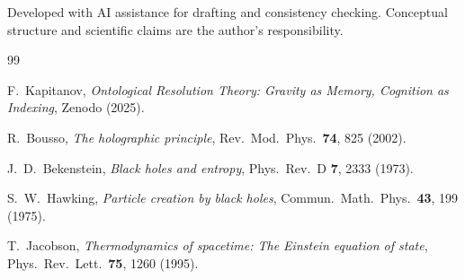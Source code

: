 \documentclass[12pt,a4paper]{article}
\begin{document}
Developed with AI assistance for drafting and consistency checking. Conceptual structure and scientific claims are the author's responsibility.

\begin{thebibliography}{99}

F.~Kapitanov,
\emph{Ontological Resolution Theory: Gravity as Memory, Cognition as Indexing},
Zenodo (2025).

R.~Bousso,
\emph{The holographic principle},
Rev.\ Mod.\ Phys.\ \textbf{74}, 825 (2002).

J.~D.~Bekenstein,
\emph{Black holes and entropy},
Phys.\ Rev.\ D \textbf{7}, 2333 (1973).

S.~W.~Hawking,
\emph{Particle creation by black holes},
Commun.\ Math.\ Phys.\ \textbf{43}, 199 (1975).

T.~Jacobson,
\emph{Thermodynamics of spacetime: The Einstein equation of state},
Phys.\ Rev.\ Lett.\ \textbf{75}, 1260 (1995).

\end{thebibliography}
\end{document}
